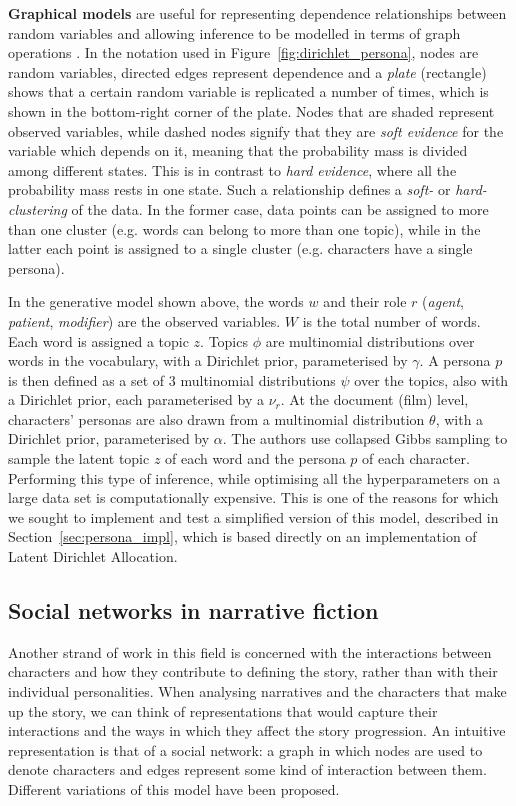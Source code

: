 \documentclass[bsc,frontabs,singlespacing,parskip, twoside]{infthesis}
\begin{document}
\textbf{Graphical models} are useful for representing dependence relationships between random variables and allowing inference to be modelled in terms of graph operations \cite{barber2012bayesian}. In the notation used in Figure~\ref{fig:dirichlet_persona}, nodes are random variables, directed edges represent dependence and a \textit{plate} (rectangle) shows that a certain random variable is replicated a number of times, which is shown in the bottom-right corner of the plate. Nodes that are shaded represent observed variables, while dashed nodes signify that they are \textit{soft evidence} for the variable which depends on it, meaning that the probability mass is divided among different states. This is in contrast to \textit{hard evidence}, where all the probability mass rests in one state. Such a relationship defines a \textit{soft-} or \textit{hard-clustering} of the data. In the former case, data points can be assigned to more than one cluster (e.g. words can belong to more than one topic), while in the latter each point is assigned to a single cluster (e.g. characters have a single persona).

In the generative model shown above, the words $w$ and their role $r$ (\textit{agent}, \textit{patient}, \textit{modifier}) are the observed variables. $W$ is the total number of words. Each word is assigned a topic $z$. Topics $\phi$ are multinomial distributions over words in the vocabulary, with a Dirichlet prior, parameterised by $\gamma$. A persona $p$ is then defined as a set of 3 multinomial distributions $\psi$ over the topics, also with a Dirichlet prior, each parameterised by a $\nu_r$. At the document (film) level, characters' personas are also drawn from a multinomial distribution $\theta$, with a Dirichlet prior, parameterised by $\alpha$. The authors use collapsed Gibbs sampling \cite{griffiths2004finding} to sample the latent topic $z$ of each word and the persona $p$ of each character. Performing this type of inference, while optimising all the hyperparameters on a large data set is computationally expensive. This is one of the reasons for which we sought to implement and test a simplified version of this model, described in Section~\ref{sec:persona_impl}, which is based directly on an implementation of Latent Dirichlet Allocation.

\subsection{Social networks in narrative fiction}
Another strand of work in this field is concerned with the interactions between characters and how they contribute to defining the story, rather than with their individual personalities. When analysing narratives and the characters that make up the story, we can think of representations that would capture their interactions and the ways in which they affect the story progression. An intuitive representation is that of a social network: a graph in which nodes are used to denote characters and edges represent some kind of interaction between them. Different variations of this model have been proposed.
\end{document}
